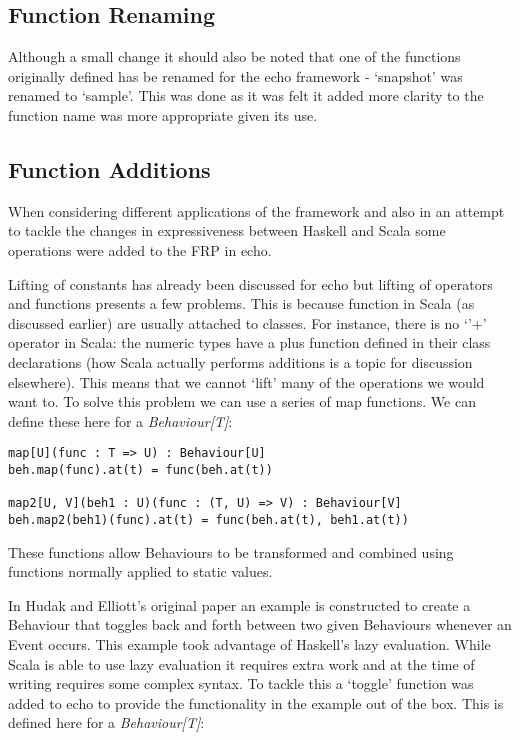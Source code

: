     \subsection{Function Renaming}
      Although a small change it should also be noted that one of the functions originally defined
      has be renamed for the echo framework - `snapshot' was renamed to `sample'. This was done as
      it was felt it added more clarity to the function name was more appropriate given its use.
      
    \subsection{Function Additions}
      When considering different applications of the framework and also in an attempt to
      tackle the changes in expressiveness between Haskell and Scala some operations
      were added to the FRP in echo.
      
      Lifting of constants has already been discussed for echo but lifting of operators and
      functions presents a few problems. This is because function in Scala (as discussed earlier)
      are usually attached to classes. For instance, there is no `'+' operator in Scala: the numeric
      types have a plus function defined in their class declarations (how Scala actually performs additions
      is a topic for discussion elsewhere). This means that we cannot `lift' many of the operations we
      would want to. To solve this problem we can use a series of map functions. We can define these
      here for a \emph{Behaviour[T]}:

\begin{verbatim}
map[U](func : T => U) : Behaviour[U]
beh.map(func).at(t) = func(beh.at(t))

map2[U, V](beh1 : U)(func : (T, U) => V) : Behaviour[V]
beh.map2(beh1)(func).at(t) = func(beh.at(t), beh1.at(t))
\end{verbatim}        

      These functions allow Behaviours to be transformed and combined using functions
      normally applied to static values.
      
      In Hudak and Elliott's original paper an example is constructed to create a Behaviour
      that toggles back and forth between two given Behaviours whenever an Event occurs. This
      example took advantage of Haskell's lazy evaluation. While Scala is able to use lazy evaluation
      it requires extra work and at the time of writing requires some complex syntax. To tackle this
      a `toggle' function was added to echo to provide the functionality in the example out of the box.
      This is defined here for a \emph{Behaviour[T]}:
      
